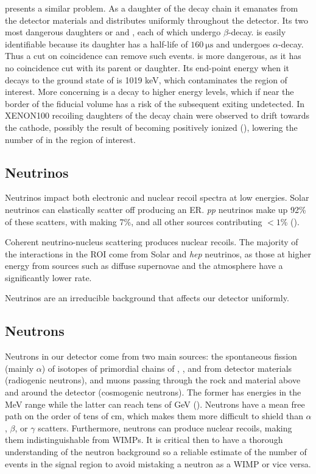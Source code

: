  presents a similar problem.  As a daughter of the  decay chain it emanates from the detector materials and distributes
uniformly throughout the detector.  Its two most dangerous daughters or \leadtwofourteen and , each of which
undergo $\beta$-decay.   is easily identifiable because its daughter \poloniumtwofourteen has a half-life of
$160\ \mathrm{\mu s}$ and undergoes $\alpha$-decay.  Thus a cut on coincidence can remove such events.  \leadtwofourteen is more
dangerous, as it has no coincidence cut with its parent or daughter.  Its end-point energy when it decays to the ground state of
\bismuthtwofourteen is 1019 keV, which contaminates the region of interest.  More concerning is a decay to higher energy levels, which
if near the border of the fiducial volume has a risk of the subsequent \gammaray exiting undetected.  In XENON100 recoiling daughters of
the  decay chain were observed to drift towards the cathode, possibly the result of becoming positively ionized
(), lowering the number of \betadecays in the region of interest.


\subsection{Neutrinos}
\label{subsec:neutrinos}
Neutrinos impact both electronic and nuclear recoil spectra at low energies.  Solar neutrinos can elastically scatter off \electron
producing an ER.  \textit{pp} neutrinos make up 92\% of these scatters, with  making 7\%, and all other sources contributing
$<1$\% ().

Coherent neutrino-nucleus scattering produces nuclear recoils.  The majority of the interactions in the ROI come from Solar 
and \textit{hep} neutrinos, as those at higher energy from sources such as diffuse supernovae and the atmosphere have a significantly
lower rate.

Neutrinos are an irreducible background that affects our detector uniformly.


\subsection{Neutrons}
\label{subsec:neutrons}
Neutrons in our detector come from two main sources: the spontaneous fission (mainly $\alpha$) of isotopes of primordial chains of
\uranium, , and  from detector materials (radiogenic neutrons), and muons
passing through the rock and material above and around the detector (cosmogenic neutrons).  The former has energies in the MeV range
while the latter can reach tens of GeV ().  Neutrons have a mean free path on the order of tens of cm, which makes
them more difficult to shield than $\alpha$, $\beta$, or $\gamma$ scatters.  Furthermore, neutrons can produce nuclear recoils, making
them indistinguishable from WIMPs.  It is critical then to have a thorough understanding of the neutron background so a reliable
estimate of the number of events in the signal region to avoid mistaking a neutron as a WIMP or vice versa.

